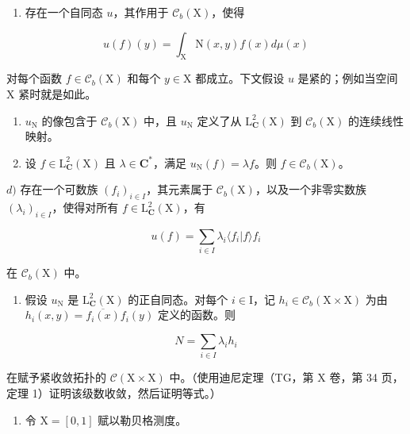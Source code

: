 \begin{enumerate}
\def\labelenumi{\alph{enumi})}
\tightlist
\item
  存在一个自同态 \(u\)，其作用于 \(\mathcal{C}_b(\mathrm{X})\)，使得
\end{enumerate}

\[
u (f) (y) = \int_ {\mathrm{X}} \mathrm{N} (x, y) f (x) d \mu (x)
\]

对每个函数 \(f \in \mathcal{C}_b(\mathrm{X})\) 和每个 \(y \in \mathrm{X}\) 都成立。下文假设 \(u\) 是紧的；例如当空间 \(\mathrm{X}\) 紧时就是如此。

\begin{enumerate}
\def\labelenumi{\alph{enumi})}
\setcounter{enumi}{1}
\item
  \(u_{\mathrm{N}}\) 的像包含于 \(\mathcal{C}_b(\mathrm{X})\) 中，且 \(u_{\mathrm{N}}\) 定义了从 \(\mathrm{L}_{\mathbf{C}}^{2}(\mathrm{X})\) 到 \(\mathcal{C}_b(\mathrm{X})\) 的连续线性映射。
\item
  设 \(f \in \mathrm{L}_{\mathbf{C}}^{2}(\mathrm{X})\) 且 \(\lambda \in \mathbf{C}^*\)，满足 \(u_{\mathrm{N}}(f) = \lambda f\)。则 \(f \in \mathcal{C}_b(\mathrm{X})\)。
\end{enumerate}

\(d)\) 存在一个可数族 \((f_i)_{i\in I}\)，其元素属于 \(\mathcal{C}_b(\mathrm{X})\)，以及一个非零实数族 \((\lambda_i)_{i\in I}\)，使得对所有 \(f\in \mathrm{L}_{\mathbf{C}}^2 (\mathrm{X})\)，有

\[
u (f) = \sum_ {i \in I} \lambda_ {i} \langle f _ {i} | f \rangle f _ {i}
\]

在 \(\mathcal{C}_b(\mathrm{X})\) 中。

\begin{enumerate}
\def\labelenumi{\alph{enumi})}
\setcounter{enumi}{4}
\tightlist
\item
  假设 \(u_{\mathrm{N}}\) 是 \(\mathrm{L}_{\mathbf{C}}^{2}(\mathrm{X})\) 的正自同态。对每个 \(i \in \mathrm{I}\)，记 \(h_i \in \mathcal{C}_b(\mathrm{X} \times \mathrm{X})\) 为由 \(h_i(x,y) = \overline{f_i(x)} f_i(y)\) 定义的函数。则
\end{enumerate}

\[
N = \sum_ {i \in I} \lambda_ {i} h _ {i}
\]

在赋予紧收敛拓扑的 \(\mathcal{C}(\mathrm{X}\times\mathrm{X})\) 中。（使用迪尼定理（TG，第 X 卷，第 34 页，定理 1）证明该级数收敛，然后证明等式。）

\begin{enumerate}
\def\labelenumi{\arabic{enumi})}
\setcounter{enumi}{15}
\tightlist
\item
  令 \(\mathrm{X} = [0,1]\) 赋以勒贝格测度。
\end{enumerate}

